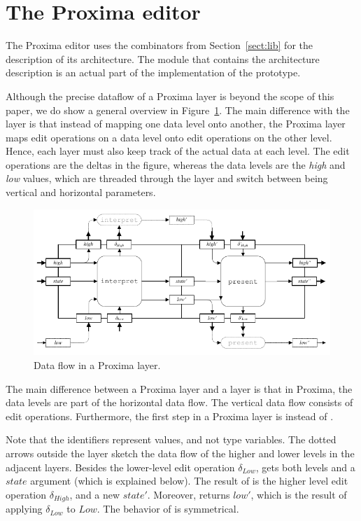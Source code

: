 \documentclass[preprint,natbib]{sigplanconf}
\begin{document}
							
%																
\section{The Proxima editor} \label{sect:proxima}


The Proxima editor uses the combinators from Section~\ref{sect:lib} for the description of its architecture. The module that contains the architecture description is an actual part of the implementation of the prototype. 

Although the precise dataflow of a Proxima layer is beyond the scope of this paper, we do show a general overview in Figure~\ref{proximaDataFlow}. The main difference with the  layer is that instead of mapping one data level onto another, the Proxima layer maps edit operations on a data level onto edit operations on the other level. Hence, each layer must also keep track of the actual data at each level. The edit operations are the deltas in the figure, whereas the data levels are the {\em high} and {\em low} values, which are threaded through the layer and switch between being vertical and horizontal parameters. 


\begin{figure}
\includegraphics[width=\columnwidth]{images/LayerDataFlow}
\caption{Data flow in a Proxima layer.} \label{proximaDataFlow}
\end{figure}



\bc
The main difference between a Proxima layer and a  layer is that in Proxima, the data levels are part of the horizontal data flow. The vertical data flow consists of edit operations. Furthermore, the first step in a Proxima layer is  instead of .

Note that the identifiers represent values, and not type variables. The dotted arrows outside the layer sketch the data flow of the higher and lower levels in the adjacent layers. Besides the lower-level edit operation $\delta_{Low}$,  gets both levels and a $state$ argument (which is explained below). The result of  is the higher level edit operation $\delta_{High}$, and a new $state'$. Moreover,  returns $low'$, which is the result of applying $\delta_{Low}$ to $Low$. The behavior of  is symmetrical.
\end{document}

